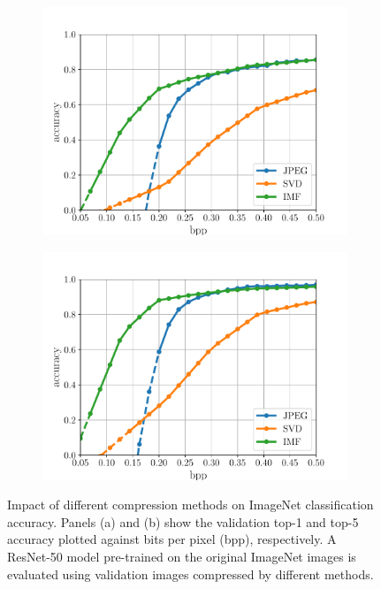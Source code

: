 \begin{figure}[t]
	\centering
	\begin{subfigure}{.5\textwidth}
		\centering
				\includegraphics[width=.95\textwidth]{figures/classification_subset_performance_top1.pdf}
		\caption{}
		\label{fig: top1-vs-bpp imagenet}
	\end{subfigure}%
	\begin{subfigure}{.5\textwidth}
		\centering
				\includegraphics[width=.95\textwidth]{figures/classification_subset_performance_top5.pdf}
		\caption{}
		\label{fig: top5-vs-bpp imagenet}
	\end{subfigure}
	\caption{Impact of different compression methods on ImageNet classification accuracy. Panels (a) and (b) show the validation top-1 and top-5 accuracy plotted against bits per pixel (bpp), respectively. A ResNet-50 model pre-trained on the original ImageNet images is evaluated using validation images compressed by different methods.}
	\label{fig:imagenet_classification}
\end{figure}


